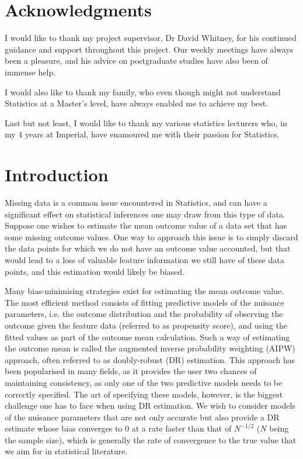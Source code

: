 \documentclass[12pt,twoside]{article}
\begin{document}
\clearpage
\section*{Acknowledgments}
I would like to thank my project supervisor, Dr David Whitney, for his continued guidance and support throughout this project. Our weekly meetings have always been a pleasure, and his advice on postgraduate studies have also been of immense help. 

I would also like to thank my family, who even though might not understand Statistics at a Master's level, have always enabled me to achieve my best.

Last but not least, I would like to thank my various statistics lecturers who, in my 4 years at Imperial, have enamoured me with their passion for Statistics.

\clearpage{\pagestyle{empty}\cleardoublepage}

\tableofcontents 

\clearpage
\listoffigures
\listoftables

\clearpage
{}
\setcounter{page}{1}
\fancyhead[L]{\textsl{\leftmark}}

\section{Introduction} 

Missing data is a common issue encountered in Statistics, and can have a significant effect on statistical inferences one may draw from this type of data. Suppose one wishes to estimate the mean outcome value of a data set that has some missing outcome values. One way to approach this issue is to simply discard the data points for which we do not have an outcome value accounted, but that would lead to a loss of valuable feature information we still have of these data points, and this estimation would likely be biased.

Many bias-minimising strategies exist for estimating the mean outcome value. The most efficient method consists of fitting predictive models of the nuisance parameters, i.e. the outcome distribution and the probability of observing the outcome given the feature data (referred to as propensity score), and using the fitted values as part of the outcome mean calculation. Such a way of estimating the outcome mean is called the augmented inverse probability weighting (AIPW) approach, often referred to as doubly-robust (DR) estimation. This approach has been popularised in many fields, as it provides the user two chances of maintaining consistency, as only one of the two predictive models needs to be correctly specified. The art of specifying these models, however, is the biggest challenge one has to face when using DR estimation. We wish to consider models of the nuisance parameters that are not only accurate but also provide a DR estimate whose bias converges to 0 at a rate faster than that of $N^{-1/2}$ ($N$ being the sample size), which is generally the rate of convergence to the true value that we aim for in statistical literature.
\end{document}

